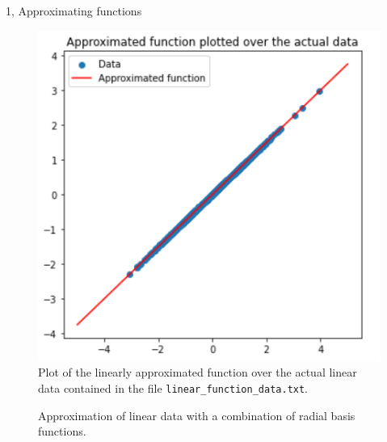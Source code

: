 \documentclass[10pt,a4paper]{article}
\begin{document}
\begin{task}{1, Approximating functions}
\begin{figure}[H]
    \centering
    \includegraphics[scale=0.8]{images/plot_approximated_func_over_linear_data.png}
    \caption{Plot of the linearly approximated function over the actual linear data contained in the file \texttt{linear\_function\_data.txt}.}
    \label{fig:approximated-func-over-linear-data}
\end{figure}

\begin{figure}[H]
    \centering
    \hfill
    \caption{Approximation of linear data with a combination of radial basis functions.}
    \label{fig:approximated-func-over-linear-data}
\end{figure}


\end{task}
\end{document}
